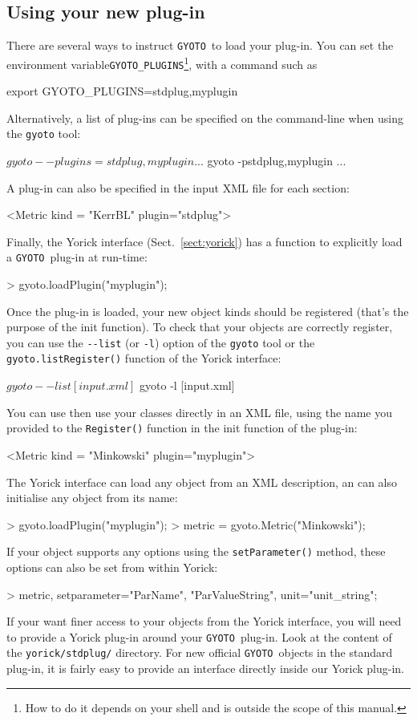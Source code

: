 \documentclass[a4paper,12pt]{article}
\newcommand{\GYOTO}{\texttt{GYOTO}}
\begin{document}
\subsection{Using your new plug-in}
\label{sect:using-plug-in}
There are several ways to instruct \GYOTO\ to load your plug-in. You
can set the environment variable\texttt{GYOTO\_PLUGINS}\footnote{How
  to do it depends on your shell and is outside the scope of this
  manual.}, with a command such as
\begin{code}
  export GYOTO_PLUGINS=stdplug,myplugin
\end{code}
Alternatively, a list of plug-ins can be specified on the command-line
when using the \texttt{gyoto} tool:
\begin{code}
  $ gyoto --plugins=stdplug,myplugin ...
  $ gyoto -pstdplug,myplugin ...
\end{code}
A plug-in can also be specified in the input XML file for each
section:
\begin{code}
   <Metric kind = "KerrBL" plugin="stdplug">
\end{code}
Finally, the Yorick interface (Sect.~\ref{sect:yorick}) has a function
to explicitly load a \GYOTO\ plug-in at run-time:
\begin{code}
 > gyoto.loadPlugin("myplugin");
\end{code}
Once the plug-in is loaded, your new object kinds should be registered
(that's the purpose of the init function). To check that your objects
are correctly register, you can use the \texttt{-{}-list} (or
\texttt{-l}) option of the \texttt{gyoto} tool or the
\texttt{gyoto.listRegister()} function of the Yorick interface:
\begin{code}
  $ gyoto --list [input.xml]
  $ gyoto -l [input.xml]
\end{code}

You can use then use your classes directly in an XML file, using the
name you provided to the \texttt{Register()} function in the init
function of the plug-in:
\begin{code}
   <Metric kind = "Minkowski" plugin="myplugin">
\end{code}
The Yorick interface can load any object from an XML description, an
can also initialise any object from its name:
\begin{code}
 > gyoto.loadPlugin("myplugin");
 > metric = gyoto.Metric("Minkowski");
\end{code}
If your object supports any options using the \texttt{setParameter()}
method, these options can also be set from within Yorick:
\begin{code}
 > metric, setparameter="ParName", "ParValueString", unit="unit_string";
\end{code}
If your want finer access to your objects from the Yorick interface,
you will need to provide a Yorick plug-in around your \GYOTO\
plug-in. Look at the content of the \texttt{yorick/stdplug/}
directory. For new official \GYOTO\ objects in the standard plug-in,
it is fairly easy to provide an interface directly inside our Yorick
plug-in.
\end{document}
